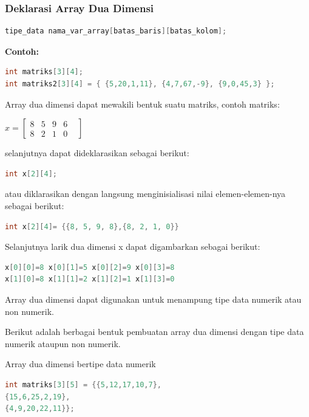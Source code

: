 \subsubsection{Deklarasi Array Dua
Dimensi}\label{deklarasi-array-dua-dimensi}

\begin{lstlisting}[language=c++, numbers=none]
tipe_data nama_var_array[batas_baris][batas_kolom];
\end{lstlisting}

\textbf{Contoh:}

\begin{lstlisting}[language=c++, numbers=none]
int matriks[3][4];
int matriks2[3][4] = { {5,20,1,11}, {4,7,67,-9}, {9,0,45,3} };
\end{lstlisting}

Array dua dimensi dapat mewakili bentuk suatu matriks, contoh matriks:


$x=
\begin{bmatrix}
	8 &5& 9 & 6 & \\
	8 & 2 & 1 & 0
\end{bmatrix}$

selanjutnya dapat dideklarasikan sebagai berikut:

\begin{lstlisting}[language=c++]
int x[2][4];
\end{lstlisting}

atau diklarasikan dengan langsung menginisialisasi nilai
elemen-elemen-nya sebagai berikut:

\begin{lstlisting}[language=c++, numbers=none]
int x[2][4]= {{8, 5, 9, 8},{8, 2, 1, 0}}
\end{lstlisting}

Selanjutnya larik dua dimensi x dapat digambarkan sebagai berikut:

\begin{lstlisting}[language=c++, numbers=none]
x[0][0]=8 x[0][1]=5 x[0][2]=9 x[0][3]=8
x[1][0]=8 x[1][1]=2 x[1][2]=1 x[1][3]=0
\end{lstlisting}

Array dua dimensi dapat digunakan untuk menampung tipe data numerik atau
non numerik.

Berikut adalah berbagai bentuk pembuatan array dua dimensi dengan tipe
data numerik ataupun non numerik.

Array dua dimensi bertipe data numerik

\begin{lstlisting}[language=c++, numbers=none]
int matriks[3][5] = {{5,12,17,10,7},
{15,6,25,2,19},
{4,9,20,22,11}};
\end{lstlisting}


